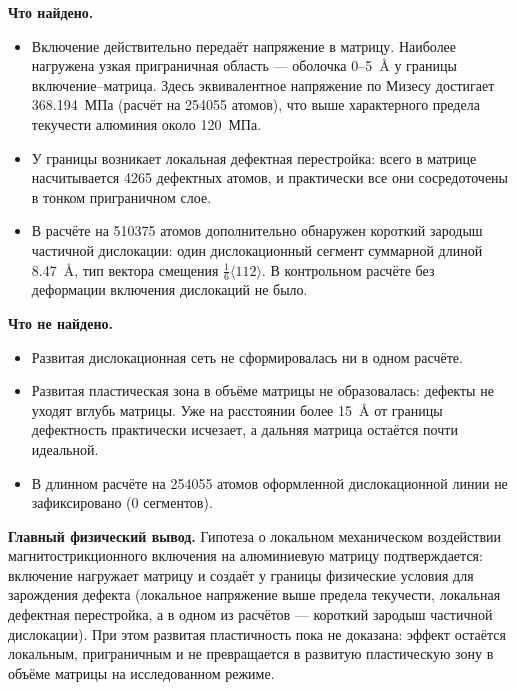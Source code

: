 \documentclass[12pt,a4paper]{extarticle}
\begin{document}
\smallskip
\noindent\textbf{Что найдено.}
\begin{itemize}[leftmargin=1.4em,itemsep=2pt,topsep=2pt]
\item Включение действительно передаёт напряжение в матрицу. Наиболее нагружена узкая приграничная область — оболочка 0--5~Å у границы включение--матрица. Здесь эквивалентное напряжение по Мизесу достигает 368.194~МПа (расчёт на 254055 атомов), что выше характерного предела текучести алюминия около 120~МПа.
\item У границы возникает локальная дефектная перестройка: всего в матрице насчитывается 4265 дефектных атомов, и практически все они сосредоточены в тонком приграничном слое.
\item В расчёте на 510375 атомов дополнительно обнаружен короткий зародыш частичной дислокации: один дислокационный сегмент суммарной длиной 8.47~Å, тип вектора смещения $\tfrac{1}{6}\langle 112\rangle$. В контрольном расчёте без деформации включения дислокаций не было.
\end{itemize}

\smallskip
\noindent\textbf{Что не найдено.}
\begin{itemize}[leftmargin=1.4em,itemsep=2pt,topsep=2pt]
\item Развитая дислокационная сеть не сформировалась ни в одном расчёте.
\item Развитая пластическая зона в объёме матрицы не образовалась: дефекты не уходят вглубь матрицы. Уже на расстоянии более 15~Å от границы дефектность практически исчезает, а дальняя матрица остаётся почти идеальной.
\item В длинном расчёте на 254055 атомов оформленной дислокационной линии не зафиксировано (0 сегментов).
\end{itemize}

\smallskip
\noindent\textbf{Главный физический вывод.} Гипотеза о локальном механическом воздействии магнитострикционного включения на алюминиевую матрицу подтверждается: включение нагружает матрицу и создаёт у границы физические условия для зарождения дефекта (локальное напряжение выше предела текучести, локальная дефектная перестройка, а в одном из расчётов — короткий зародыш частичной дислокации). При этом развитая пластичность пока не доказана: эффект остаётся локальным, приграничным и не превращается в развитую пластическую зону в объёме матрицы на исследованном режиме.

\end{document}
